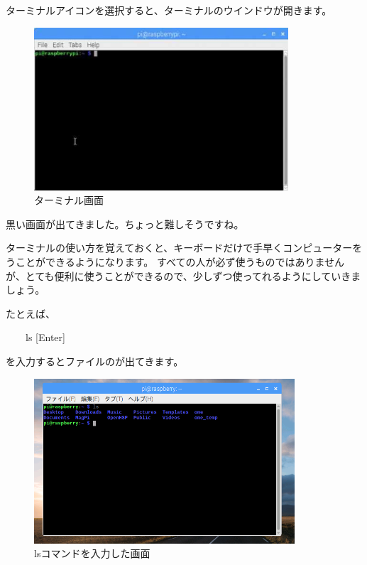 ターミナルアイコンを選択すると、ターミナルのウインドウが開きます。

\begin{figure}[H]
  \begin{center}
    \includegraphics[keepaspectratio,width=9.472cm,height=6.061cm]{images/chap02/text02-img004.png}
    \caption{ターミナル画面}
  \end{center}
  \label{fig:terminal_display}
\end{figure}

\noindent
黒い画面が出てきました。ちょっと難しそうですね。

ターミナルの使い方を覚えておくと、キーボードだけで手早くコンピューターをうことができるようになります。
すべての人が必ず使うものではありませんが、とても便利に使うことができるので、少しずつ使ってれるようにしていきましょう。

\noindent
たとえば、

\vspace{1em}
\ \ \ \ ls [Enter]
\vspace{1em}
  
\noindent
を入力するとファイルのが出てきます。

\begin{figure}[H]
  \begin{center}
    \includegraphics[width=9.71cm,height=6.138cm]{images/chap02/text02-img005.png}
    \caption{lsコマンドを入力した画面}
  \end{center}
  \label{fig:terminal_ls}
\end{figure}

